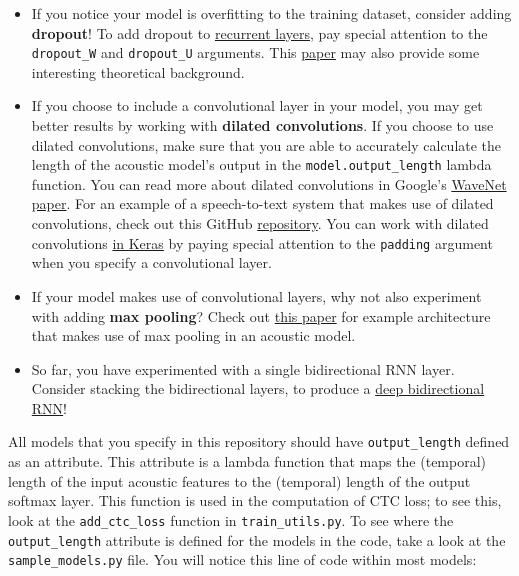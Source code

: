 \documentclass[11pt]{article}
\providecommand{\tightlist}{%
      \setlength{\itemsep}{0pt}\setlength{\parskip}{0pt}}
\begin{document}
\begin{itemize}
\tightlist
\item
  If you notice your model is overfitting to the training dataset,
  consider adding \textbf{dropout}! To add dropout to
  \href{https://faroit.github.io/keras-docs/1.0.2/layers/recurrent/}{recurrent
  layers}, pay special attention to the \texttt{dropout\_W} and
  \texttt{dropout\_U} arguments. This
  \href{http://arxiv.org/abs/1512.05287}{paper} may also provide some
  interesting theoretical background.
\item
  If you choose to include a convolutional layer in your model, you may
  get better results by working with \textbf{dilated convolutions}. If
  you choose to use dilated convolutions, make sure that you are able to
  accurately calculate the length of the acoustic model's output in the
  \texttt{model.output\_length} lambda function. You can read more about
  dilated convolutions in Google's
  \href{https://arxiv.org/abs/1609.03499}{WaveNet paper}. For an example
  of a speech-to-text system that makes use of dilated convolutions,
  check out this GitHub
  \href{https://github.com/buriburisuri/speech-to-text-wavenet}{repository}.
  You can work with dilated convolutions
  \href{https://keras.io/layers/convolutional/}{in Keras} by paying
  special attention to the \texttt{padding} argument when you specify a
  convolutional layer.
\item
  If your model makes use of convolutional layers, why not also
  experiment with adding \textbf{max pooling}? Check out
  \href{https://arxiv.org/pdf/1701.02720.pdf}{this paper} for example
  architecture that makes use of max pooling in an acoustic model.
\item
  So far, you have experimented with a single bidirectional RNN layer.
  Consider stacking the bidirectional layers, to produce a
  \href{https://www.cs.toronto.edu/~graves/asru_2013.pdf}{deep
  bidirectional RNN}!
\end{itemize}

All models that you specify in this repository should have
\texttt{output\_length} defined as an attribute. This attribute is a
lambda function that maps the (temporal) length of the input acoustic
features to the (temporal) length of the output softmax layer. This
function is used in the computation of CTC loss; to see this, look at
the \texttt{add\_ctc\_loss} function in \texttt{train\_utils.py}. To see
where the \texttt{output\_length} attribute is defined for the models in
the code, take a look at the \texttt{sample\_models.py} file. You will
notice this line of code within most models:
\end{document}
